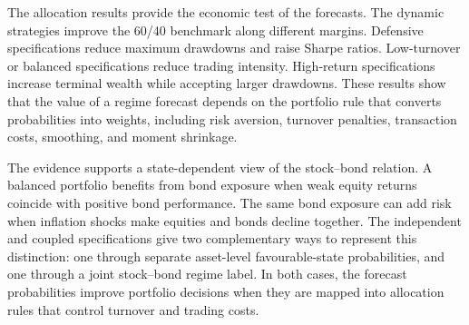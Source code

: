 \documentclass[10pt]{article}
\begin{document}
The allocation results provide the economic test of the forecasts. The dynamic strategies improve the 60/40 benchmark along different margins. Defensive specifications reduce maximum drawdowns and raise Sharpe ratios. Low-turnover or balanced specifications reduce trading intensity. High-return specifications increase terminal wealth while accepting larger drawdowns. These results show that the value of a regime forecast depends on the portfolio rule that converts probabilities into weights, including risk aversion, turnover penalties, transaction costs, smoothing, and moment shrinkage.

The evidence supports a state-dependent view of the stock--bond relation. A balanced portfolio benefits from bond exposure when weak equity returns coincide with positive bond performance. The same bond exposure can add risk when inflation shocks make equities and bonds decline together. The independent and coupled specifications give two complementary ways to represent this distinction: one through separate asset-level favourable-state probabilities, and one through a joint stock--bond regime label. In both cases, the forecast probabilities improve portfolio decisions when they are mapped into allocation rules that control turnover and trading costs.

\appendix
\renewcommand{\thefigure}{\thesection.\arabic{figure}}
\renewcommand{\thetable}{\thesection.\arabic{table}}


\end{document}
